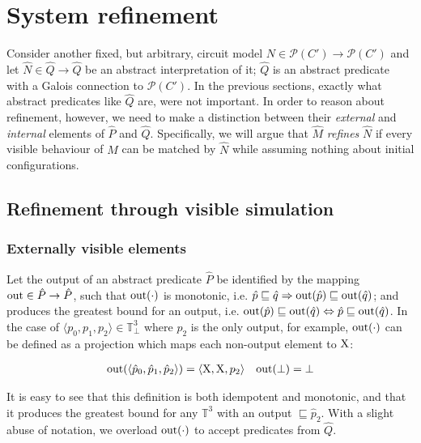 \section{System refinement}

Consider another fixed, but arbitrary, circuit model $N \in \mathcal{P}(C') \rightarrow \mathcal{P}(C')$ and let $\hat N \in \hat Q \rightarrow \hat Q$ be an abstract interpretation of it; $\hat Q$ is an abstract predicate with a Galois connection to $\mathcal{P}(C')$. In the previous sections, exactly what abstract predicates like $\hat Q$ are, were not important. In order to reason about refinement, however, we need to make a distinction between their \textit{external} and \textit{internal} elements of $\hat P$ and $\hat Q$. Specifically, we will argue that $\hat M$ \textit{refines} $\hat N$ if every visible behaviour of $\hat M$ can be matched by $\hat N$ while assuming nothing about initial configurations.

\subsection{Refinement through visible simulation}

\subsubsection{Externally visible elements} Let the output of an abstract predicate $\hat P$ be identified by the mapping $\operatorname{out} \in \hat P \rightarrow \hat P$, such that $\operatorname{out}(\cdot)$ is monotonic, i.e. $\hat p \sqsubseteq \hat q \Rightarrow \operatorname{out}(\hat p) \sqsubseteq \operatorname{out}(\hat q)$; and produces the greatest bound for an output, i.e. $\operatorname{out}(\hat p) \sqsubseteq \operatorname{out}(\hat q) \Leftrightarrow \hat p \sqsubseteq \operatorname{out}(\hat q)$. In the case of $\langle p_{0}, p_{1}, p_{2} \rangle \in \mathbb{T}_{\bot}^{3}$ where $p_{2}$ is the only output, for example, $\operatorname{out}(\cdot)$ can be defined as a projection which maps each non-output element to $\mathrm{X}$:



\begin{align*}
\operatorname{out}(\langle \hat p_{0}, \hat p_{1}, \hat p_{2} \rangle) = \langle \mathrm{X}, \mathrm{X}, p_{2} \rangle && \operatorname{out}(\bot) = \bot
\end{align*}

\noindent It is easy to see that this definition is both idempotent and monotonic, and that it produces the greatest bound for any $\mathbb{T}^{3}$ with an output $\sqsubseteq \hat p_{2}$. With a slight abuse of notation, we overload $\operatorname{out}(\cdot)$ to accept predicates from $\hat Q$.

